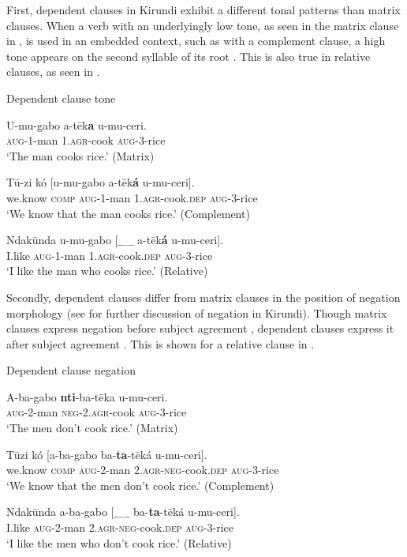 \documentclass[output=paper,colorlinks,citecolor=brown
]{langscibook}
\begin{document}
First, dependent clauses in Kirundi exhibit a different tonal patterns than matrix clauses. When a verb with an underlyingly low tone, as seen in the matrix clause in , is used in an embedded context, such as with a complement clause, a high tone appears on the second syllable of its root . This is also true in relative clauses, as seen in .


\ea  Dependent clause tone
\begin{xlist}
\ex	\label{ex:myers:mattone} \gll	U-mu-gabo a-tēk{\bfseries  a} u-mu-ceri. \label{ex:low}\\
			\textsc{aug}-1-man \textsc{1.agr}-cook \textsc{aug}-3-rice\\
			\glt `The man cooks rice.'  \hfill{(Matrix)}

\ex 	\label{ex:myers:comptone}	
\gll Tū-zi kó [u-mu-gabo a-tēk{\bfseries  á} u-mu-ceri].\\
we.know \textsc{comp} \textsc{aug}-1-man \textsc{1.agr}-cook.\textsc{dep} \textsc{aug}-3-rice \\
\glt `We know that the man cooks rice.' \hfill{(Complement)}

\ex	\label{ex:myers:reltone}	\gll	Ndakūnda  u-mu-gabo [{$\_$\_$\_$} a-tēk{\bfseries  á} u-mu-ceri]. \\
		I.like \textsc{aug}-1-man {} \textsc{1.agr}-cook.\textsc{dep} \textsc{aug}-3-rice \\
		\glt `I like the man who cooks rice.' \hfill{(Relative)} 
\end{xlist}
\z	

Secondly, dependent clauses differ from matrix clauses in the position of negation morphology (see \citealt{Chaperon:2023} for further discussion of negation in Kirundi). Though matrix clauses express negation before subject agreement , dependent clauses express it after subject agreement . This is shown for a relative clause in .

\ea Dependent clause negation
\begin{xlist}
\ex \label{ex:myers:neg1} \gll	A-ba-gabo {\bfseries  nti}-ba-tēka u-mu-ceri. \label{ex:neg1}\\
			\textsc{aug}-2-man \textsc{neg-2.agr}-cook  \textsc{aug}-3-rice\\
			\glt `The men don't cook rice.' \hfill{(Matrix)}
			
\ex \label{ex:myers:neg2}  		
\gll Tūzi kó [a-ba-gabo ba-{\bfseries  ta}-tēká u-mu-ceri].\\
we.know \textsc{comp} \textsc{aug}-2-man \textsc{2.agr-neg}-cook\textsc{.dep} \textsc{aug}-3-rice\\
\glt `We know that the men don't cook rice.' \hfill{(Complement)}

\ex \label{ex:myers:neg3}		\gll	Ndakūnda a-ba-gabo [{$\_$\_$\_$} ba-{\bfseries  ta}-tēká u-mu-ceri]. \\
		I.like \textsc{aug}-2-man {} \textsc{2.agr-neg}-cook.\textsc{dep} \textsc{aug}-3-rice \\
		\glt `I like the men who don't cook rice.' \hfill{(Relative)} 
		
		\end{xlist}
		\z
\end{document}
